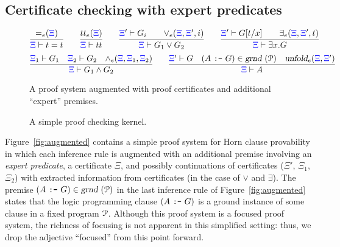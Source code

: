 \documentclass[a4paper,USenglish,cleveref, autoref, thm-restate]{lipics-v2019}
\begin{document}
\subsection{Certificate checking with expert predicates}
\label{ssec:fpc}




\begin{figure}
\newcommand{\XXi}{{\color{blue}{\Xi}}}
\[
\infer{\XXi\vdash t = t}
      {\eqExpert{\XXi}}
\qquad
\infer{\XXi\vdash \true}
      {\trueExpert{\XXi}}
\qquad
\infer{\XXi\vdash G_1\vee G_2}
      {\XXi'\vdash G_i\qquad \orExpert{\XXi}{\XXi'}{i}}
\qquad
\infer{\XXi\vdash \exists x. G}
      {\XXi'\vdash G[t/x]\qquad \someExpert{\XXi}{\XXi'}{t}}
\]
\vskip -6pt
\[
\infer{\XXi\vdash G_1\wedge G_2}
      {\XXi_1\vdash G_1\quad \XXi_2\vdash G_2\quad \andExpert{\XXi}{\XXi_1}{\XXi_2}}
\qquad
\infer{\XXi\vdash A}
      {\XXi'\vdash G \quad (A~\hbox{\tt :-}~G)\in\instan\Pscr
                     \quad \unfoldExpert{\XXi}{\XXi'}}
\]
\caption{A proof system augmented with proof certificates and
  additional ``expert'' premises.}
\label{fig:augmented}


\caption{A simple proof checking kernel.}
\label{fig:kernel}
\end{figure}

Figure~\ref{fig:augmented} contains a simple proof system for Horn
clause provability in which each inference rule is augmented with an
additional premise involving an \emph{expert predicate}, a
certificate $\Xi$, and possibly continuations of certificates ($\Xi'$,
$\Xi_1$, $\Xi_2$) with extracted information from certificates (in the
case of $\vee$ and $\exists$).
%
%
The premise $(A~\hbox{\tt :-}~G)\in\hbox{\sl grnd}~({\mathcal P})$ in the last
inference rule of Figure~\ref{fig:augmented} states that the logic
programming clause $(A~\hbox{\tt :-}~G)$ is a ground instance of some
clause in a fixed program ${\mathcal P}$.
%
Although this proof system is a focused proof system, the
richness of focusing is not apparent in this simplified 
setting: thus, we drop the adjective ``focused'' from this point forward.
\end{document}

